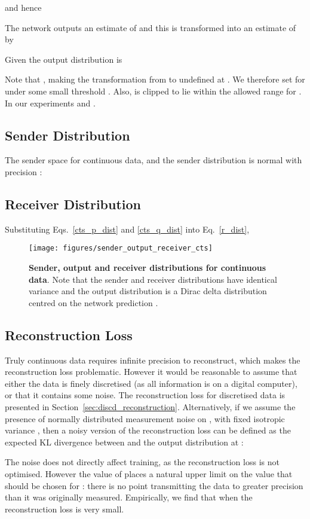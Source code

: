 \documentclass[11pt,table]{article}
\newcommand{\0}[1]{\constvec{0}{#1}}
\newcommand{\1}[1]{\constvec{1}{#1}}
\begin{document}
and hence

The network outputs an estimate  of  and this is transformed into an estimate  of  by 

Given  the output distribution is

Note that , making the transformation from  to  undefined at . 
We therefore set  for  under some small threshold .
Also,   is clipped to lie within the allowed range  for .
In our experiments  and .
\subsection{Sender Distribution \texorpdfstring{}{}}\label{sec:cts_sender}
The sender space  for continuous data, and the sender distribution is normal with precision :

\subsection{Receiver Distribution \texorpdfstring{}{}}
Substituting Eqs.~\ref{cts_p_dist} and  \ref{cts_q_dist} into Eq.~\ref{r_dist},

\begin{figure}[t!]
\texttt{[image: figures/sender\_output\_receiver\_cts]}
\caption{\textbf{Sender, output and receiver distributions for continuous data}. Note that the sender and receiver distributions have identical variance and the output distribution is a Dirac delta distribution centred on the network prediction .}
\end{figure}
\subsection{Reconstruction Loss \texorpdfstring{}{}}\label{sec:cts_reconstruction}
Truly continuous data requires infinite precision to reconstruct, which makes the reconstruction loss problematic.
However it would be reasonable to assume that either the data is finely discretised (as all information is on a digital computer), or that it contains some noise.
The reconstruction loss for discretised data is presented in Section~\ref{sec:discd_reconstruction}. 
Alternatively, if we assume the presence of normally distributed measurement noise on , with fixed isotropic variance , then a noisy version of the reconstruction loss can be defined as the expected KL divergence between  and the output distribution at :

The noise does not directly affect training, as the reconstruction loss is not optimised. 
However the value of  places a natural upper limit on the value that should be chosen for : there is no point transmitting the data to greater precision than it was originally measured.
Empirically, we find that when  the reconstruction loss is very small.
\end{document}
